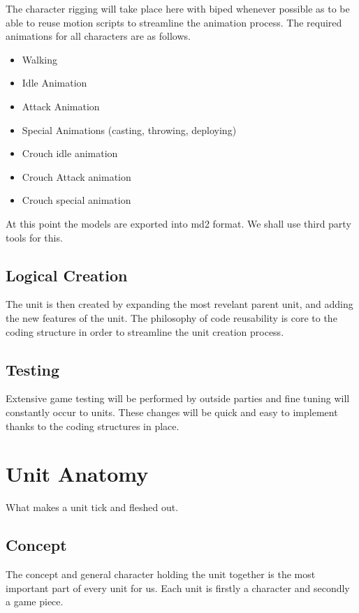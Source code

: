 \documentclass[a4paper]{article}
\begin{document}
The character rigging will take place here with biped whenever possible as to be able to reuse motion scripts to streamline the animation process. The required animations for all characters are as follows.

\begin{itemize}
\item Walking
\item Idle Animation
\item Attack Animation
\item Special Animations (casting, throwing, deploying)
\item Crouch idle animation
\item Crouch Attack animation
\item Crouch special animation
\end{itemize}

At this point the models are exported into md2 format. We shall use third party tools for this.

\subsection{Logical Creation}

The unit is then created by expanding the most revelant parent unit, and adding the new features of the unit. The philosophy of code reusability is core to the coding structure in order to streamline the unit creation process.

\subsection{Testing}

Extensive game testing will be performed by outside parties and fine tuning will constantly occur to units. These changes will be quick and easy to implement thanks to the coding structures in place.


\newpage \section{Unit Anatomy}

What makes a unit tick and fleshed out.

\subsection{Concept}

The concept and general character holding the unit together is the most important part of every unit for us. Each unit is firstly a character and secondly a game piece.
\end{document}

